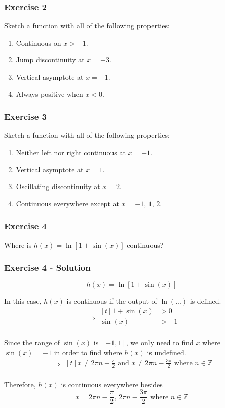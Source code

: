 \documentclass[12pt]{beamer}
\begin{document}
\begin{frame}
	\frametitle{Exercise 2}
	\vfill
	\vfill
	\vfill
	\vfill
	Sketch a function with all of the following properties:\par
	\vfill
	\begin{enumerate}\itemsep2ex
		\item Continuous on $x > -1$.
		\item Jump discontinuity at $x = -3$.
		\item Vertical asymptote at $x = -1$.
		\item Always positive when $x < 0$.
	\end{enumerate}
	\vfill
	\vfill
	\vfill
	\vfill
	\vfill
\end{frame}
\begin{frame}
	\frametitle{Exercise 3}
	\vfill
	\vfill
	\vfill
	\vfill
	Sketch a function with all of the following properties:\par
	\vfill
	\begin{enumerate}\itemsep2ex
		\item Neither left nor right continuous at $x = -1$.
		\item Vertical asymptote at $x = 1$.
		\item Oscillating discontinuity at $x = 2$.
		\item Continuous everywhere except at $x = -1\text{, } 1\text{, } 2$.
	\end{enumerate}
	\vfill
	\vfill
	\vfill
	\vfill
	\vfill
\end{frame}
\begin{frame}
	\frametitle{Exercise 4}
	\Large
	Where is $h(x) = \ln[1+\sin(x)]$ continuous?
\end{frame}
\begin{frame}
	\frametitle{Exercise 4 - Solution}

	\large
	\[h(x) = \ln[1+\sin(x)]\]\par
	\vfill
	\small
	In this case, $h(x)$ is continuous if the output of $\ln(...)$ is defined.
	\[
		\implies\begin{aligned}[t]
			1+\sin(x) & > 0  \\
			\sin(x)   & > -1 \\
		\end{aligned}
	\]\par
	Since the range of $\sin(x)$ is $[-1, 1]$, we only need to find $x$ where $\sin(x)=-1$ in order to find where $h(x)$ is undefined.
	\[
		\implies\begin{aligned}[t]
			x \neq 2\pi n - \frac{\pi}{2} \text{ and } x \neq 2\pi n - \frac{3\pi}{2} \text{ where } n\in \mathbb{Z} \\
		\end{aligned}
	\]\par
	Therefore, $h(x)$ is continuous everywhere besides \[x = 2\pi n - \frac{\pi}{2} \text{, } 2\pi n - \frac{3\pi}{2} \text{ where } n\in \mathbb{Z}\]
\end{frame}
\end{document}
